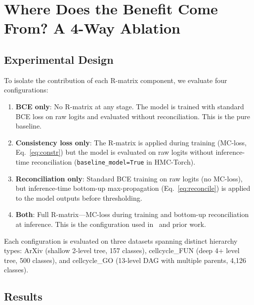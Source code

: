 \section{Where Does the Benefit Come From? A 4-Way Ablation}
\label{sec:ablation}

\subsection{Experimental Design}

To isolate the contribution of each R-matrix component, we evaluate four
configurations:

\begin{enumerate}[leftmargin=*,nosep]
  \item \textbf{BCE only}: No R-matrix at any stage. The model is
    trained with standard BCE loss on raw logits and evaluated without
    reconciliation. This is the pure baseline.
  \item \textbf{Consistency loss only}: The R-matrix is applied during
    training (MC-loss, Eq.~\ref{eq:constr}) but the model is evaluated
    on raw logits without inference-time reconciliation
    (\texttt{baseline\_model=True} in HMC-Torch).
  \item \textbf{Reconciliation only}: Standard BCE training on raw
    logits (no MC-loss), but inference-time bottom-up max-propagation
    (Eq.~\ref{eq:reconcile}) is applied to the model outputs before
    thresholding.
  \item \textbf{Both}: Full R-matrix---MC-loss during training and
    bottom-up reconciliation at inference. This is the configuration
    used in~\cite{sette2026hmctorch} and prior work.
\end{enumerate}

Each configuration is evaluated on three datasets spanning distinct
hierarchy types: ArXiv (shallow 2-level tree, 157 classes),
cellcycle\_FUN (deep 4+ level tree, 500 classes), and cellcycle\_GO
(13-level DAG with multiple parents, 4,126 classes).

\subsection{Results}

